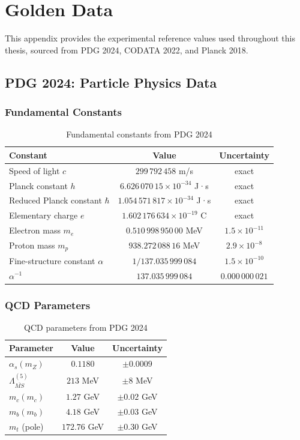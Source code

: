 \appendix
\chapter{Golden Data}
\label{appendix:G}

This appendix provides the experimental reference values used throughout this thesis, sourced from PDG 2024, CODATA 2022, and Planck 2018.

\section{PDG 2024: Particle Physics Data}

\subsection{Fundamental Constants}

\begin{table}[h]
\centering
\begin{tabular}{lcc}
\hline
Constant & Value & Uncertainty \\
\hline
Speed of light $c$ & $299\,792\,458$ m/s & exact \\
Planck constant $h$ & $6.626\,070\,15\times10^{-34}$ J·s & exact \\
Reduced Planck constant $\hbar$ & $1.054\,571\,817\times10^{-34}$ J·s & exact \\
Elementary charge $e$ & $1.602\,176\,634\times10^{-19}$ C & exact \\
Electron mass $m_e$ & $0.510\,998\,950\,00$ MeV & $1.5\times10^{-11}$ \\
Proton mass $m_p$ & $938.272\,088\,16$ MeV & $2.9\times10^{-8}$ \\
Fine-structure constant $\alpha$ & $1/137.035\,999\,084$ & $1.5\times10^{-10}$ \\
$\alpha^{-1}$ & $137.035\,999\,084$ & $0.000\,000\,021$ \\
\hline
\end{tabular}
\caption{Fundamental constants from PDG 2024}
\end{table}

\subsection{QCD Parameters}

\begin{table}[h]
\centering
\begin{tabular}{lcc}
\hline
Parameter & Value & Uncertainty \\
\hline
$\alpha_s(m_Z)$ & $0.1180$ & $\pm0.0009$ \\
$\Lambda_{\overline{MS}}^{(5)}$ & $213$ MeV & $\pm 8$ MeV \\
$m_c(m_c)$ & $1.27$ GeV & $\pm0.02$ GeV \\
$m_b(m_b)$ & $4.18$ GeV & $\pm0.03$ GeV \\
$m_t$ (pole) & $172.76$ GeV & $\pm0.30$ GeV \\
\hline
\end{tabular}
\caption{QCD parameters from PDG 2024}
\end{table}

